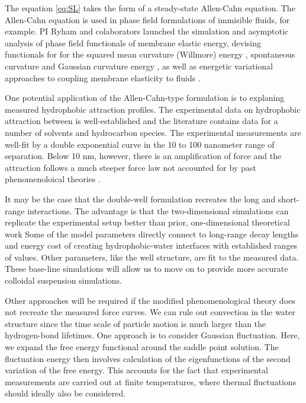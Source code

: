 The equation \eqref{eq:SL} takes the form of a steady-state
Allen-Cahn equation. The Allen-Cahn equation is used in phase field
formulations of immisible fluids, for example.
PI Ryham and colaborators launched the simulation and asymptotic analysis
of phase field functionals of membrane elastic energy,
devising functionals for  
for the squared mean curvature (Willmore) energy \cite{0951-7715-18-3-016}, 
spontaneous curvature \cite{Du05} and Gaussian curvature energy \cite{DuEuler},
as well as energetic variational approaches to coupling membrane elasticity to fluids \cite{QiangDu09}. 

One potential application of the Allen-Cahn-type formulation is to
explaning measured hydrophobic attraction profiles.
The experimental data on hydrophobic attraction between 
is well-established and the literature contains data for a number of
solvents and hydrocarbon species. The experimental measurements
are well-fit by a double exponential curve in the 10 to 100 nanometer range
of separation.  Below 10 nm, however, there is an amplification of force
and the attraction follows a much steeper force law not accounted
for by past phenomenoloical theories \cite{Lin2005}.

It may be the case that the double-well formulation recreates the
long and short-range interactions.  The advantage
is that the two-dimensional simulations can replicate the
experimental setup better than prior, one-dimensional theoretical work 
Some of the model parameters directly connect 
to long-range decay lengths and energy cost of creating hydrophobic-water
interfaces with established ranges of values. Other parameters, like the
well structure, are fit to the measured data. These base-line simulations
will allow us to move on to provide more accurate colloidal suspension
simulations. 

Other approaches will be required if the modified phenomenological theory 
does not recreate the measured force curves.
We can rule out convection in the water structure since  
the time scale of particle motion is much larger than
the hydrogen-bond lifetimes. One approach is to consider Gaussian fluctuation.
Here, we expand the free energy functional around the saddle point solution.
The fluctuation energy then involves calculation of the eigenfunctions of
the second variation of the free energy. This accounts for the fact
that experimental measurements are carried out at finite 
temperatures, where thermal fluctuations should ideally also be considered. 

